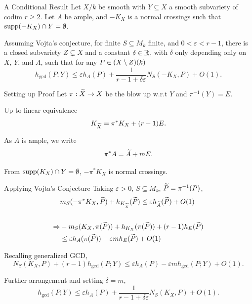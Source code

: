 \documentclass{beamer}
\begin{document}
\begin{frame}{A Conditional Result}
    Let $X/k$ be smooth with $Y \subseteq X$ a smooth subvariety of codim $r \geq 2$.
    Let $A$ be ample,
    and $-K_X$ is a normal crossings such that ${\rm supp}(-K_X) \cap Y = \emptyset$.

    \vspace{5mm}

    Assuming Vojta's conjecture,
    for finite $S \subseteq M_k$ finite,  and $0 < \varepsilon < r - 1$,
    there is a closed subvariety $Z \subsetneq X$ and a constant $\delta \in \mathbb{R}$,
    with $\delta$ only depending only on $X$, $Y$, and $A$,
    such that for any $P \in (X \setminus Z)(k)$
    \[
        h_{\gcd}(P; Y)
            \leq \varepsilon h_{A}(P) + \frac{1}{r - 1 + \delta \varepsilon} N_S(-K_X, P) + O(1).
    \]
\end{frame}

\begin{frame}{Setting up Proof}
    Let $\pi : \widetilde X \to X$ be the blow up w.r.t $Y$ and $\pi^{-1}(Y) = E$.

    \vspace{5mm}
    
    Up to linear equivalence
    \[
        K_{\widetilde X} = \pi^* K_X + (r - 1)E.
    \]

    \vspace{5mm}
    
    As $A$ is ample, we write
    \[
        \pi^*A = \widetilde A + m E.
    \]

    \vspace{5mm}

    From ${\rm supp}(K_X) \cap Y = \emptyset$,
     $-\pi^* K_X$ is normal crossings.

\end{frame}

\begin{frame}{Applying Vojta's Conjecture}
    Taking $\varepsilon > 0$, $S \subseteq M_k$, $\widetilde P = \pi^{-1}(P)$,
    \begin{align*}
        & m_S(-\pi^*K_X, \widetilde P)
        + h_{K_{\widetilde X}}(\widetilde P)
        \leq \varepsilon h_{\widetilde A}(\widetilde P)
        + O(1) \\ \\
        \Rightarrow
        & -m_S(K_X, \pi(\widetilde P))
        + h_{K_X}(\pi(\widetilde P))
        + (r - 1)h_{E}(\widetilde P) \\
        & \leq \varepsilon h_{A}(\pi(\widetilde P))
            - \varepsilon m h_{E}(\widetilde P)
            + O(1)
    \end{align*}
    
    \vspace{5mm}
    
    Recalling generalized GCD,
    \[
        N_S(K_X, P)
        + (r - 1)h_{\gcd}(P; Y)
        \leq \varepsilon h_A(P)
        - \varepsilon m
        h_{\gcd}(P; Y) + O(1).
    \]

    \vspace{5mm}
    
    Further arrangement and setting $\delta = m$,
    \[
        h_{\gcd}(P; Y)
        \leq \varepsilon h_A(P)
        + \frac{1}{r - 1 + \delta \varepsilon} N_S(K_X, P)+ O(1).
    \]
\end{frame}
\end{document}
